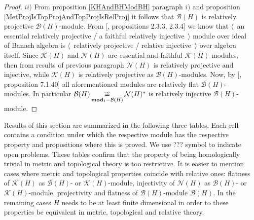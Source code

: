 \begin{proof}
$ii)$ From proposition \ref{KHAndBHModBH} paragraph $i)$ and proposition \ref{MetProjIsTopProjAndTopProjIsRelProj} it follows that $\mathcal{B}(H)$ is relatively projective $\mathcal{B}(H)$-module. From [\cite{RamsHomPropSemgroupAlg}, propositions 2.3.3, 2.3.4] we know that $\langle$~an essential relatively projective / a faithful relatively injective~$\rangle$ module over ideal of Banach algebra is $\langle$~relatively projective / relative injective~$\rangle$ over algebra itself. Since $\mathcal{K}(H)$ and $\mathcal{N}(H)$ are essential and faithful $\mathcal{K}(H)$-modules, then from results of previous paragraph $\mathcal{N}(H)$ is relatively projective and injective, while $\mathcal{K}(H)$ is relatively projective as $\mathcal{B}(H)$-modules. Now, by [\cite{HelBanLocConvAlg}, proposition 7.1.40] all aforementioned modules are relatively flat $\mathcal{B}(H)$-modules. In particular $\mathcal{B}(H)\mathop{\mathbin{\cong}}\limits_{\mathbf{mod}_1-\mathcal{B}(H)}\mathcal{N}(H)^*$ is relatively injective $\mathcal{B}(H)$-module.
\end{proof}

Results of this section are summarized in the following three tables. Each cell contains a condition under which the respective module has the respective property and propositions where this is proved. We use ??? symbol to indicate open problems. These tables confirm that the property of being homologically trivial in metric and topological theory is too restrictive. It is easier to mention cases where metric and topological properties coincide with relative ones: flatness of $\mathcal{K}(H)$ as $\mathcal{B}(H)$- or $\mathcal{K}(H)$-module, injectivity of $\mathcal{N}(H)$ as $\mathcal{B}(H)$- or $\mathcal{K}(H)$-module, projectivity and flatness of $\mathcal{B}(H)$-module $\mathcal{B}(H)$. In the remaining cases $H$ needs to be at least finite dimensional in order to these properties be equivalent in metric, topological and relative theory.


